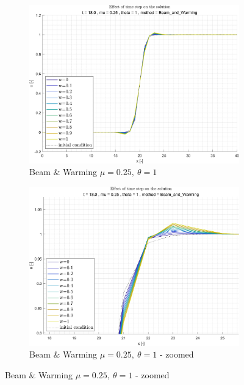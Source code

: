 \documentclass[11pt, a4paper]{article}
\begin{document}
\begin{figure}[H]
\begin{subfigure}[c]{.38\textwidth}
        \label{fig:Beam_&_Warming_general_mu0.001_theta0.5_B_diff_w}
    \end{subfigure}
    \begin{subfigure}[c]{.38\textwidth}
        \centering
        \includegraphics[width=\textwidth]{images/grap18.png}
        \caption{Beam $\&$ Warming $\mu=0.25,\ \theta=1$}
        \label{fig:Beam & Warming_general_mu0.25_theta1_A_diff_w}
    \end{subfigure}
    \begin{subfigure}[c]{.38\textwidth}
        \centering
        \includegraphics[width=\textwidth]{images/grap18.1.png}
        \caption{Beam $\&$ Warming $\mu=0.25,\ \theta=1$ - zoomed}
        \label{fig:Beam & Warming_general_mu0.25_theta1_B_diff_w}

\end{subfigure}
\end{figure}
\end{document}
